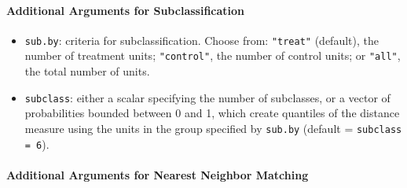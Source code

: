 \paragraph{Additional Arguments for Subclassification}
\label{subsubsec:inputs-subclass}

\begin{itemize}
\item \texttt{sub.by}: criteria for subclassification.  Choose from:
  \texttt{"treat"} (default), the number of treatment units;
  \texttt{"control"}, the number of control units; or \texttt{"all"},
  the total number of units.
\item \texttt{subclass}: either a scalar specifying the number of
  subclasses, or a vector of probabilities bounded between 0 and 1,
  which create quantiles of the distance measure using the units in
  the group specified by \texttt{sub.by} (default = \texttt{subclass =
    6}).
\end{itemize}

\paragraph{Additional Arguments for Nearest Neighbor Matching}
\label{subsubsec:inputs-nearest}

